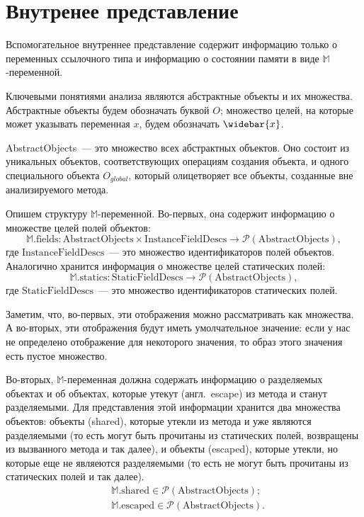 \documentclass[14pt,titlepage,draft]{extarticle}
\newcommand{\M}{\ensuremath{\mathbb{M}}}
\newcommand{\Mfield}[1]{\textrm{#1}}
\newcommand{\Mhyp}{$\mathbb{M}$\hyp}
\newcommand{\pts}[1]{\widebar{#1}}
\newcommand{\powerset}[1]{\mathcal{P}(#1)}
\newcommand{\eng}[1]{{\English#1}}
\newcommand{\engdef}[1]{(англ.~\eng{#1})}
\let\oldsection\section
\renewcommand{\section}{\newpage\oldsection}
\newcommand{\sectionwithoutnumber}[1]{
  \section*{#1}
  \addcontentsline{toc}{section}{#1}
}
\begin{document}
  \listoftodos

  \tableofcontents

  \sectionwithoutnumber{Внутренее представление}

    Вспомогательное внутреннее представление содержит информацию только о
    переменных ссылочного типа и информацию о состоянии памяти в виде
    \Mhyp переменной.

    Ключевыми понятиями анализа являются абстрактные объекты и их множества.
    Абстрактные объекты будем обозначать буквой $O$; множество целей, на
    которые может указывать переменная $x$, будем обозначать $\pts{x}$.

    \textrm{AbstractObjects}~--- это множество всех абстрактных объектов. Оно
    состоит из уникальных объектов, соответствующих операциям создания объекта,
    и одного специального объекта $O_{global}$, который олицетворяет все
    объекты, созданные вне анализируемого метода.

    Опишем структуру \Mhyp переменной. Во-первых, она содержит информацию о
    множестве целей полей объектов:
    \[ \M.\Mfield{fields}\colon
      \textrm{AbstractObjects} \times \textrm{InstanceFieldDescs} \to
      \powerset{\textrm{AbstractObjects}},
    \]
    где $\textrm{InstanceFieldDescs}$~--- это множество идентификаторов полей
    объектов.
    Аналогично хранится информация о множестве целей статических полей:
    \[ \M.\Mfield{statics}\colon
      \textrm{StaticFieldDescs} \to
      \powerset{\textrm{AbstractObjects}},
    \]
    где $\textrm{StaticFieldDescs}$~--- это множество идентификаторов
    статических полей.

    Заметим, что, во-первых, эти отображения можно рассматривать как множества.
    А во-вторых, эти отображения будут иметь умолчательное значение: если у нас
    не определено отображение для некоторого значения, то образ этого значения
    есть пустое множество.

    Во-вторых, \Mhyp переменная должна содержать информацию о разделяемых
    объектах и об объектах, которые утекут \engdef{escape} из метода и станут
    разделяемыми. Для представления этой информации хранится два множества
    объектов: объекты (\eng{shared}), которые утекли из метода и уже являются
    разделяемыми (то есть могут быть прочитаны из статических полей, возвращены
    из вызванного метода и так далее), и объекты (\eng{escaped}), которые
    утекли, но которые еще не являеются разделяемыми (то есть не могут быть
    прочитаны из статических полей и так далее).
    \[\begin{aligned}
      &\M.\Mfield{shared} \in \powerset{\textrm{AbstractObjects}}; \\
      &\M.\Mfield{escaped} \in \powerset{\textrm{AbstractObjects}}.
    \end{aligned}\]
\end{document}
